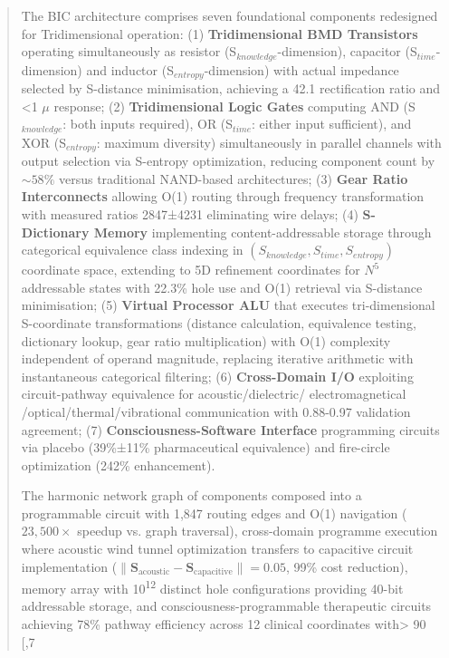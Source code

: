 \documentclass[11pt,a4paper]{article}
\begin{document}
\begin{abstract}
The BIC architecture comprises seven foundational components redesigned for Tridimensional operation: (1) \textbf{Tridimensional BMD Transistors} operating simultaneously as resistor (S$_{knowledge}$-dimension), capacitor (S$_{time}$-dimension) and inductor (S$_{entropy}$-dimension) with actual impedance selected by S-distance minimisation, achieving a 42.1 rectification ratio and <1 $\mu$ response; (2) \textbf{Tridimensional Logic Gates}\cite{stellas_circuits} computing AND (S$_{knowledge}$: both inputs required), OR (S$_{time}$: either input sufficient), and XOR (S$_{entropy}$: maximum diversity) simultaneously in parallel channels with output selection via S-entropy optimization, reducing component count by $\sim 58\%$ versus traditional NAND-based architectures; (3) \textbf{Gear Ratio Interconnects} allowing O(1) routing through frequency transformation with measured ratios 2847±4231 eliminating wire delays; (4) \textbf{S-Dictionary Memory}\cite{stellas_dictionary} implementing content-addressable storage through categorical equivalence class indexing in $(S_{knowledge}, S_{time}, S_{entropy})$ coordinate space, extending to 5D refinement coordinates for $N^5$ addressable states with 22.3\% hole use and O(1) retrieval via S-distance minimisation; (5) \textbf{Virtual Processor ALU}\cite{virtual_processor} that executes tri-dimensional S-coordinate transformations (distance calculation, equivalence testing, dictionary lookup, gear ratio multiplication) with O(1) complexity independent of operand magnitude, replacing iterative arithmetic with instantaneous categorical filtering; (6) \textbf{Cross-Domain I/O} exploiting circuit-pathway equivalence for acoustic/dielectric/ electromagnetical /optical/thermal/vibrational communication with 0.88-0.97 validation agreement; (7) \textbf{Consciousness-Software Interface} programming circuits via placebo (39\%±11\% pharmaceutical equivalence) and fire-circle optimization (242\% enhancement).

 The harmonic network graph of components composed into a programmable circuit with 1,847 routing edges and O(1) navigation ($23,500\times$ speedup vs. graph traversal), cross-domain programme execution where acoustic wind tunnel optimization transfers to capacitive circuit implementation ($\|\mathbf{S}_{\text{acoustic}} - \mathbf{S}_{\text{capacitive}}\| = 0.05$, 99\% cost reduction), memory array with 10\textsuperscript{12} distinct hole configurations providing 40-bit addressable storage, and consciousness-programmable therapeutic circuits achieving 78\% pathway efficiency across 12 clinical coordinates with> 90 [,7


\end{abstract}
\end{document}
